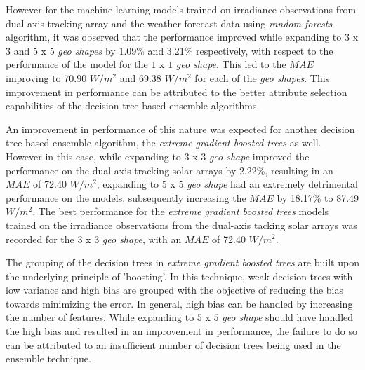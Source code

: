 \par However for the machine learning models trained on irradiance observations from dual-axis tracking array and the weather forecast data using \textit{random forests} algorithm, it was observed that the performance improved while expanding to $3$ x $3$ and $5$ x $5$ \textit{geo shapes} by 1.09\% and 3.21\% respectively, with respect to the performance of the model for the $1$ x $1$ \textit{geo shape}. This led to the $MAE$ improving to 70.90 $W/m^2$ and 69.38 $W/m^2$ for each of the \textit{geo shapes}. This improvement in performance can be attributed to the better attribute selection capabilities of the decision tree based ensemble algorithms. 

\par An improvement in performance of this nature was expected for another decision tree based ensemble algorithm, the \textit{extreme gradient boosted trees} as well. However in this case, while expanding to $3$ x $3$ \textit{geo shape} improved the performance on the dual-axis tracking solar arrays by 2.22\%, resulting in an $MAE$ of 72.40 $W/m^2$, expanding to $5$ x $5$ \textit{geo shape} had an extremely detrimental performance on the models, subsequently increasing the $MAE$ by 18.17\% to 87.49 $W/m^2$. The best performance for the \textit{extreme gradient boosted trees} models trained on the irradiance observations from the dual-axis tacking solar arrays was recorded for the $3$ x $3$ \textit{geo shape}, with an $MAE$ of 72.40 $W/m^2$. 

\par The grouping of the decision trees in \textit{extreme gradient boosted trees} are built upon the underlying principle of 'boosting'. In this technique, weak decision trees with low variance and high bias are grouped with the objective of reducing the bias towards minimizing the error. In general, high bias can be handled by increasing the number of features. While expanding to $5$ x $5$ \textit{geo shape} should have handled the high bias and resulted in an improvement in performance, the failure to do so can be attributed to an insufficient number of decision trees being used in the ensemble technique.

